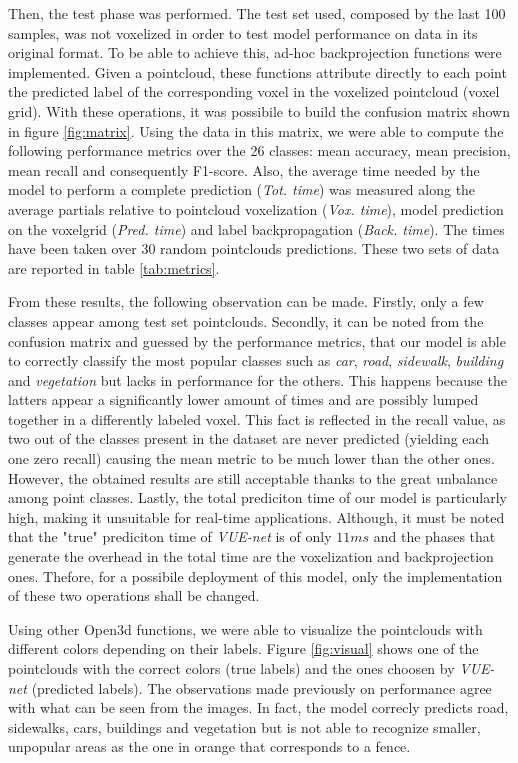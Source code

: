 Then, the test phase was performed. The test set used, composed by the last 100 samples, 
was not voxelized in order to test model performance on data in its original format.
To be able to achieve this, ad-hoc backprojection functions were implemented.
Given a pointcloud, these functions attribute directly to each point the predicted label of the
corresponding voxel in the voxelized pointcloud (voxel grid).
With these operations, it was possibile to build the confusion matrix shown in figure \ref{fig:matrix}.
Using the data in this matrix, we were able to compute the following performance metrics over the 26 classes: 
mean accuracy, mean precision, mean recall and consequently F1-score.
Also, the average time needed by the model to perform a complete prediction (\textit{Tot. time}) was measured along the average partials relative to
pointcloud voxelization (\textit{Vox. time}), model prediction on the voxelgrid (\textit{Pred. time}) and
label backpropagation (\textit{Back. time}). The times have been taken over 30 random pointclouds predictions.
These two sets of data are reported in table \ref{tab:metrics}.

From these results, the following observation can be made.
Firstly, only a few classes appear among test set pointclouds.
Secondly, it can be noted from the confusion matrix and guessed by the performance metrics, 
that our model is able to correctly classify the most popular classes such as \textit{car},
\textit{road}, \textit{sidewalk}, \textit{building} and \textit{vegetation} 
but lacks in performance for the others. 
This happens because the latters appear a significantly lower amount of times and are possibly lumped together in a differently labeled voxel. 
This fact is reflected in the recall value, as two out of the classes present in the dataset 
are never predicted (yielding each one zero recall) causing the mean metric to be much lower than the other ones.
However, the obtained results are still acceptable thanks to the great unbalance among point classes.
Lastly, the total prediciton time of our model is particularly high,
making it unsuitable for real-time applications. Although, it must be noted that the "true" prediciton time
of \textit{VUE-net} is of only $11ms$ and the phases that generate the overhead in the total time
are the voxelization and backprojection ones. Thefore, for a possibile deployment of this model, only the 
implementation of these two operations shall be changed.

Using other Open3d functions, we were able to visualize the pointclouds with different colors depending
on their labels. Figure \ref{fig:visual} shows one of the pointclouds with the
correct colors (true labels) and the ones choosen by \textit{VUE-net} (predicted labels).
The observations made previously on performance agree with what can be seen from the images.
In fact, the model correcly predicts road, sidewalks, cars, buildings and vegetation but is not
able to recognize smaller, unpopular areas as the one in orange that corresponds to a fence.
